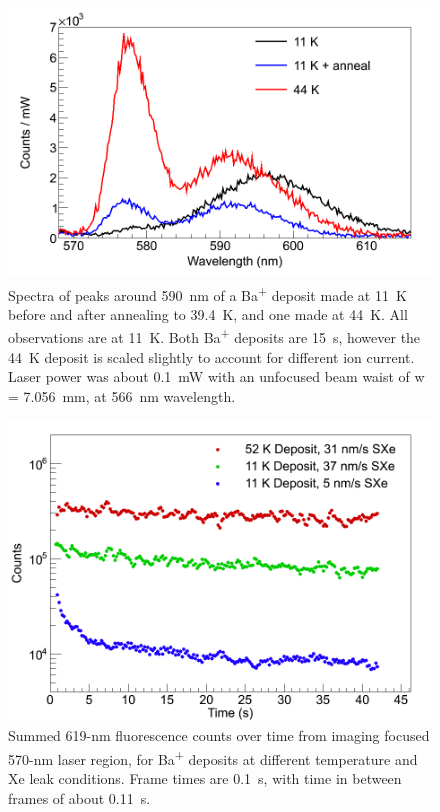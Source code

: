 \begin{figure} %
        \centering
                \includegraphics[width=.7\textwidth]{figures/spectra_temperature_conditions.png}
                \caption{Spectra of peaks around 590~nm of a Ba\textsuperscript{+} deposit made at 11~K before and after annealing to 39.4~K, and one made at 44~K.  All observations are at 11~K.  Both Ba\textsuperscript{+} deposits are 15~s, however the 44~K deposit is scaled slightly to account for different ion current.  Laser power was about 0.1~mW with an unfocused beam waist of w = 7.056~mm, at 566~nm wavelength.}
\label{fig:specTempConditions}
\end{figure}

\begin{figure} [h]
        \centering
                \includegraphics[width=.7\textwidth]{figures/619_deposit_conditions.png}
                \caption{Summed 619-nm fluorescence counts over time from imaging focused 570-nm laser region, for Ba\textsuperscript{+} deposits at different temperature and Xe leak conditions.  Frame times are 0.1~s, with time in between frames of about 0.11~s.}
\label{fig:specTempConditions619}
\end{figure}

